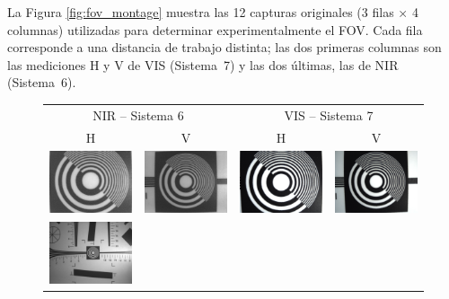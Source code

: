     La Figura \ref{fig:fov_montage} muestra las 12 capturas originales (3 filas × 4 columnas) utilizadas para determinar experimentalmente el FOV. Cada fila corresponde a una distancia de trabajo distinta; las dos primeras columnas son las mediciones H y V de VIS (Sistema 7) y las dos últimas, las de NIR (Sistema 6).
    
    \begin{figure}[H]
      \centering
      \setlength{\tabcolsep}{2pt}
      \renewcommand{\arraystretch}{0}
      \begin{tabular}{cccc}
        \multicolumn{2}{c}{\small NIR – Sistema 6} &
        \multicolumn{2}{c}{\small VIS – Sistema 7} \\
        H & V & H & V \\ 

        \includegraphics[width=.22\linewidth]{Figures/C4/FOV/NIR/H/7_1.png} &
        \includegraphics[width=.22\linewidth]{Figures/C4/FOV/NIR/V/8_7.png} &
        \includegraphics[width=.22\linewidth]{Figures/C4/FOV/VIS/H/9_2.png} &
        \includegraphics[width=.22\linewidth]{Figures/C4/FOV/VIS/V/10_7.png} \\
        \includegraphics[width=.22\linewidth]{Figures/C4/FOV/NIR/H/33_1.png} &

\end{tabular}
\end{figure}
